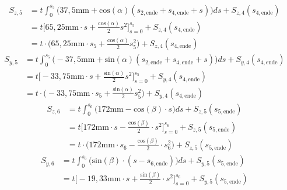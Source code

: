 \begin{itemize}
\begin{equation}
\begin{split}
\end{split}
\end{equation}
\begin{equation}
	\begin{split}
		S_{z,5} &= t\int_{0}^{s_5}\bigg(37,5\mathrm{mm}+\mathrm{cos}(\alpha)(s_{2,\mathrm{ende}}+s_{4,\mathrm{ende}}+s)\bigg)ds + S_{z,4}(s_{4,\mathrm{ende}})\\\
		&= t\bigg[65,25\mathrm{mm}\cdot s +\frac{\mathrm{cos}(\alpha)}{2}s^2\bigg]_{s=0}^{s_5} + S_{z,4}(s_{4,\mathrm{ende}})\\\
		&= t\cdot\bigg(65,25\mathrm{mm}\cdot s_5 +\frac{\mathrm{cos}(\alpha)}{2}s^2_5\bigg) + S_{z,4}(s_{4,\mathrm{ende}})
	\end{split}
\end{equation}
\begin{equation}
	\begin{split}
		S_{y,5} &= t\int_{0}^{s_5}\bigg(-37,5\mathrm{mm}+\mathrm{sin}(\alpha)(s_{2,\mathrm{ende}}+s_{4,\mathrm{ende}}+s)\bigg)ds + S_{y,4}(s_{4,\mathrm{ende}})\\\
		&= t\bigg[-33,75\mathrm{mm}\cdot s +\frac{\mathrm{sin}(\alpha)}{2}s^2\bigg]_{s=0}^{s_5} + S_{y,4}(s_{4,\mathrm{ende}})\\\
		&= t\cdot\bigg(-33,75\mathrm{mm}\cdot s_5 +\frac{\mathrm{sin}(\alpha)}{2}s^2_5\bigg) + S_{y,4}(s_{4,\mathrm{ende}})
	\end{split}
\end{equation}
\begin{equation}
	\begin{split}
		S_{z,6} &= t\int_{0}^{s_6}\bigg(172\mathrm{mm}-\mathrm{cos}(\beta)\cdot s\bigg)ds + S_{z,5}(s_{5,\mathrm{ende}})\\\
		&= t\bigg[172\mathrm{mm}\cdot s-\frac{\mathrm{cos}(\beta)}{2}\cdot s^2\bigg]_{s=0}^{s_6} + S_{z,5}(s_{5,\mathrm{ende}})\\\
		&= t\cdot\bigg(172\mathrm{mm}\cdot s_6-\frac{\mathrm{cos}(\beta)}{2}\cdot s^2_6\bigg) + S_{z,5}(s_{5,\mathrm{ende}})
	\end{split}
\end{equation}
\begin{equation}
	\begin{split}
	S_{y,6} &= t\int_{0}^{s_6}\bigg(\mathrm{sin}(\beta)\cdot(s-s_{6,\mathrm{ende}})\bigg)ds + S_{y,5}(s_{5,\mathrm{ende}})\\\
	&= t\bigg[-19,33\mathrm{mm}\cdot s + \frac{\mathrm{sin}(\beta)}{2}\cdot s^2\bigg]_{s=0}^{s_6} + S_{y,5}(s_{5,\mathrm{ende}})\\\

\end{split}
\end{equation}
\end{itemize}
